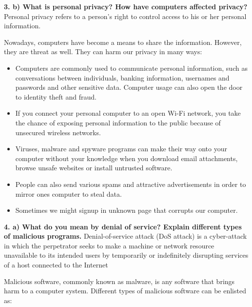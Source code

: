 \documentclass [12pt, a4paper]{article}
\begin{document}
\large
\textbf{3. b) What is personal privacy? How have computers affected privacy?}\\
\normalsize
Personal privacy refers to a person's right to control access to his or her personal information.\\
\par
Nowadays, computers have become a means to share the information. However, they are threat as well. They can harm our privacy in many ways:
\begin{itemize}
	\item Computers are commonly used to communicate personal information, such as conversations between individuals, banking information, usernames and passwords and other sensitive data. Computer usage can also open the door to identity theft and fraud.
	\item If you connect your personal computer to an open Wi-Fi network, you take the chance of exposing personal information to the public because of unsecured wireless networks.
	\item Viruses, malware and spyware programs can make their way onto your computer without your knowledge when you download email attachments, browse unsafe websites or install untrusted software.
	\item People can also send various spams and attractive advertisements in order to mirror ones computer to steal data.
	\item Sometimes we might signup in unknown page that corrupts our computer.\\
\end{itemize}

\large
\textbf{4. a) What do you mean by denial of service? Explain different types of malicious programs.}
\normalsize
Denial-of-service attack (DoS attack) is a cyber-attack in which the perpetrator seeks to make a machine or network resource unavailable to its intended users by temporarily or indefinitely disrupting services of a host connected to the Internet\\
\par
Malicious software, commonly known as malware, is any software that brings harm to a computer system. Different types of malicious software can be enlisted as:
\end{document}
